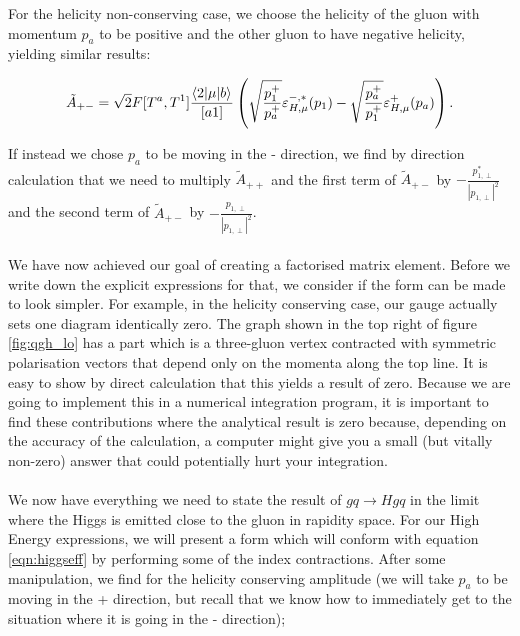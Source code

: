 For the helicity non-conserving case, we choose the helicity of the gluon with momentum $p_a$ to be positive and the other gluon to have negative helicity, yielding similar results:

\begin{equation}
\tilde{A}_{+-} = \sqrt{2} F [T^a,T^1] \frac{\mathinner{\langle2\vert\mu\vert b\rangle}_{}}{[a1]} \left(\sqrt{\frac{p_1^+}{p_a^+}}\varepsilon_{H,\mu}^{-,*}(p_1) - \sqrt{\frac{p_a^+}{p_1^+}}\varepsilon_{H,\mu}^{+}(p_a) \right).
\end{equation}

If instead we chose $p_a$ to be moving in the - direction, we find by direction calculation that we need to multiply $\tilde{A}_{++}$ and the first term of $\tilde{A}_{+-}$ by $-\frac{p_{1,\perp}^*}{|p_{1,\perp}|^2}$ and the second term of $\tilde{A}_{+-}$ by $-\frac{p_{1,\perp}}{|p_{1,\perp}|^2}$. \\
\\
We have now achieved our goal of creating a factorised matrix element. Before we write down the explicit expressions for that, we consider if the form can be made to look simpler. For example, in the helicity conserving case, our gauge actually sets one diagram identically zero. The graph shown in the top right of figure \ref{fig:qgh_lo} has a part which is a three-gluon vertex contracted with symmetric polarisation vectors that depend only on the momenta along the top line. It is easy to show by direct calculation that this yields a result of zero. Because we are going to implement this in a numerical integration program, it is important to find these contributions where the analytical result is zero because, depending on the accuracy of the calculation, a computer might give you a small (but vitally non-zero) answer that could potentially hurt your integration. \\
\\
We now have everything we need to state the result of $gq \to Hgq$ in the limit where the Higgs is emitted close to the gluon in rapidity space. For our High Energy expressions, we will present a form which will conform with equation \ref{eqn:higgseff} by performing some of the index contractions. After some manipulation, we find for the helicity conserving amplitude (we will take $p_a$ to be moving in the + direction, but recall that we know how to immediately get to the situation where it is going in the - direction);

